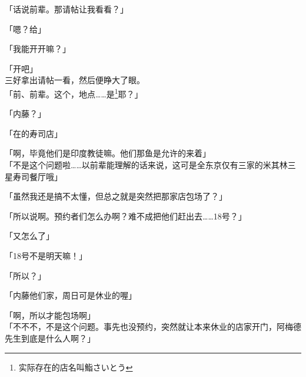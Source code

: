 「话说前辈。那请帖让我看看？」

「嗯？给」

「我能开开嘛？」

「开吧」\\

三好拿出请帖一看，然后便睁大了眼。\\

「前、前辈。这个，地点……是\footnote{实际存在的店名叫鮨さいとう}耶？」

「内藤？」

「在的寿司店」

「啊，毕竟他们是印度教徒嘛。他们那鱼是允许的来着」\\

「不是这个问题啦……以前辈能理解的话来说，这可是全东京仅有三家的米其林三星寿司餐厅哦」

「虽然我还是搞不太懂，但总之就是突然把那家店包场了？」

「所以说啊。预约者们怎么办啊？难不成把他们赶出去……18号？」

「又怎么了」

「18号不是明天嘛！」

「所以？」

「内藤他们家，周日可是休业的喔」

「啊，所以才能包场啊」\\

「不不不，不是这个问题。事先也没预约，突然就让本来休业的店家开门，阿梅德先生到底是什么人啊？」

